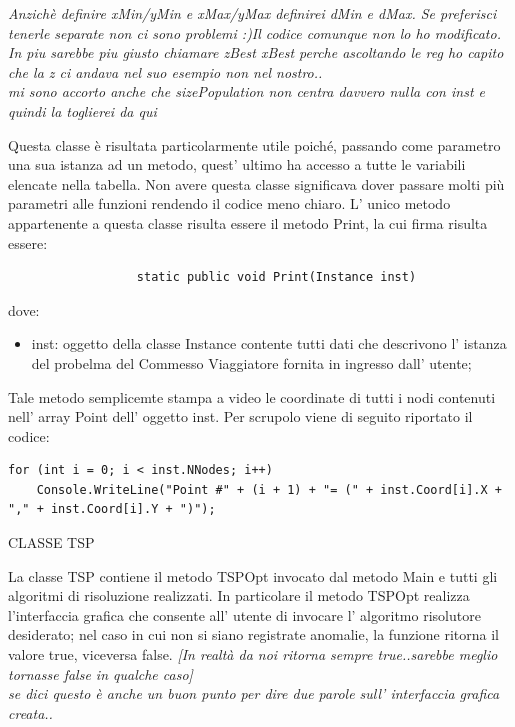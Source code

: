 \documentclass[11pt]{article}
\begin{document}
\textit{Anzich\`e definire xMin/yMin e xMax/yMax definirei dMin e dMax. Se preferisci tenerle separate non ci sono problemi :)Il codice comunque non lo ho modificato. \\ In piu sarebbe piu giusto chiamare zBest xBest perche ascoltando le reg ho capito che la z ci andava nel suo esempio non nel nostro.. \\ mi sono accorto anche che sizePopulation non centra davvero nulla con inst e quindi la toglierei da qui}


Questa classe \`e risultata particolarmente utile poich\'e, passando come parametro una sua istanza ad un metodo,  quest' ultimo ha accesso a tutte le variabili elencate nella tabella. Non avere questa classe significava dover passare molti pi\`u parametri alle funzioni rendendo il codice meno chiaro.
L' unico metodo appartenente a questa classe risulta essere il metodo Print, la cui firma risulta essere:

\begin{lstlisting}
                  static public void Print(Instance inst)
\end{lstlisting}

dove:

\begin{itemize}
\item inst: oggetto della classe Instance contente tutti dati che descrivono l' istanza del probelma del Commesso Viaggiatore fornita in ingresso dall' utente;
\end{itemize}

Tale metodo semplicemte stampa a video le coordinate di tutti i nodi contenuti nell' array Point dell' oggetto inst. Per scrupolo viene di seguito riportato il codice:

\begin{lstlisting}
for (int i = 0; i < inst.NNodes; i++)
    Console.WriteLine("Point #" + (i + 1) + "= (" + inst.Coord[i].X + "," + inst.Coord[i].Y + ")");
\end{lstlisting}

\vspace{2\baselineskip}
CLASSE TSP
\vspace{2\baselineskip}

La classe TSP contiene il metodo TSPOpt invocato dal metodo Main e tutti gli algoritmi di risoluzione realizzati. In particolare il metodo TSPOpt realizza l'interfaccia grafica che consente all' utente di invocare l' algoritmo risolutore desiderato; nel caso in cui non si siano registrate anomalie, la funzione ritorna il valore true, viceversa false. 
\textit{[In realt\`a da noi ritorna sempre true..sarebbe meglio tornasse false in qualche caso] \\ se dici questo è anche un buon punto per dire due parole sull' interfaccia grafica creata..}
\end{document}
